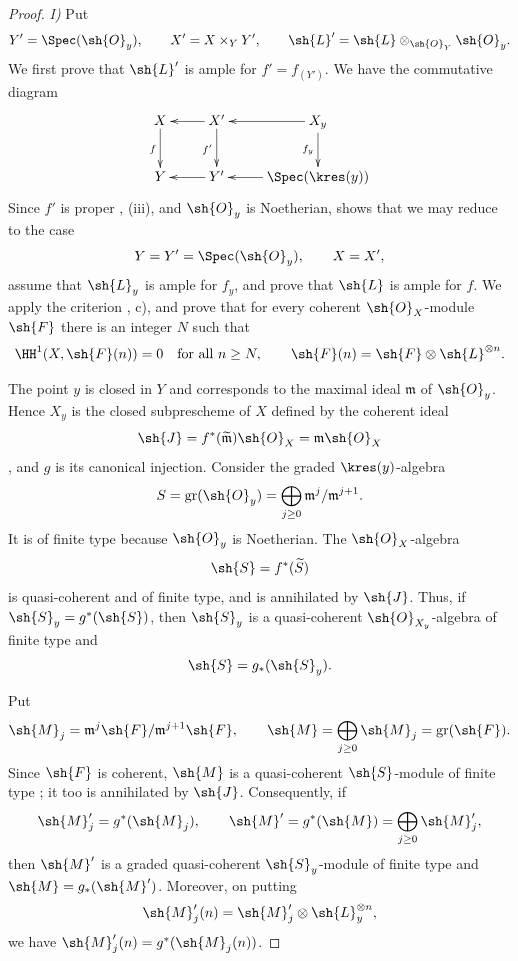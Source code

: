 \begin{proof}

\noindent\textit{I)} Put
\[
  Y'=\Spec(\sh{O}_y),\qquad
  X'=X\times_Y Y',\qquad
  \sh{L}'=\sh{L}\otimes_{\sh{O}_Y}\sh{O}_y.
\]
We first prove that $\sh{L}'$ is ample for $f'=f_{(Y')}$.  We have
the commutative diagram
\[
  \xymatrix{
    X\ar[d]_f
      &
    X'\ar[l]\ar[d]_{f'}
      &
    X_y\ar[l]\ar[d]_{f_y}
    \\
    Y
      &
    Y'\ar[l]
      &
    \Spec(\kres(y))\ar[l].
  }
\]
Since $f'$ is proper , (iii), and $\sh{O}_y$ is
Noetherian,  shows that we may reduce to the case
\[
  Y=Y'=\Spec(\sh{O}_y),\qquad X=X',
\]
assume that $\sh{L}_y$ is ample for $f_y$, and prove that $\sh{L}$
is ample for $f$.  We apply the criterion
, c), and prove that for every coherent
$\sh{O}_X$-module $\sh{F}$ there is an integer $N$ such that
\[
  \HH^1(X,\sh{F}(n))=0
  \quad\text{for all }n\geq N,
  \qquad
  \sh{F}(n)=\sh{F}\otimes\sh{L}^{\otimes n}.
\]

The point $y$ is closed in $Y$ and corresponds to the maximal ideal
$\mathfrak m$ of $\sh{O}_y$.  Hence $X_y$ is the closed
subprescheme of $X$ defined by the coherent ideal
\[
  \sh{J}
  =
  f^*(\widetilde{\mathfrak m})\sh{O}_X
  =
  \mathfrak m\sh{O}_X
\]
, and $g$ is its canonical injection.  Consider
the graded $\kres(y)$-algebra
\[
  S=\operatorname{gr}(\sh{O}_y)
   =\bigoplus_{j\geq0}
      \mathfrak m^j/\mathfrak m^{j+1}.
\]
It is of finite type because $\sh{O}_y$ is Noetherian.  The
$\sh{O}_X$-algebra
\[
  \sh{S}=f^*(\widetilde S)
\]
is quasi-coherent and of finite type, and is annihilated by
$\sh{J}$.  Thus, if $\sh{S}_y=g^*(\sh{S})$, then $\sh{S}_y$ is a
quasi-coherent $\sh{O}_{X_y}$-algebra of finite type and
\[
  \sh{S}=g_*(\sh{S}_y).
\]

Put
\[
  \sh{M}_j
  =
  \mathfrak m^j\sh{F}/\mathfrak m^{j+1}\sh{F},
  \qquad
  \sh{M}
  =
  \bigoplus_{j\geq0}\sh{M}_j
  =
  \operatorname{gr}(\sh{F}).
\]
Since $\sh{F}$ is coherent, $\sh{M}$ is a quasi-coherent
$\sh{S}$-module of finite type ; it too is
annihilated by $\sh{J}$.  Consequently, if
\[
  \sh{M}'_j=g^*(\sh{M}_j),
  \qquad
  \sh{M}'=g^*(\sh{M})
    =\bigoplus_{j\geq0}\sh{M}'_j,
\]
then $\sh{M}'$ is a graded quasi-coherent $\sh{S}_y$-module of
finite type and $\sh{M}=g_*(\sh{M}')$.  Moreover, on putting
\[
  \sh{M}'_j(n)
  =
  \sh{M}'_j\otimes\sh{L}_y^{\otimes n},
\]
we have $\sh{M}'_j(n)=g^*(\sh{M}_j(n))$.


\end{proof}
